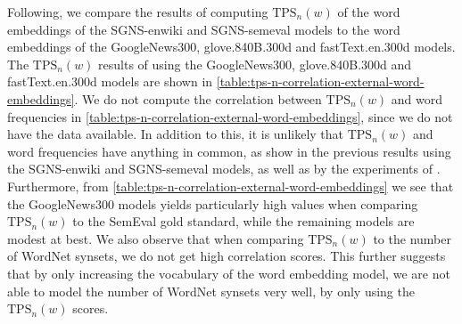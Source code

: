 
Following, we compare the results of computing $\text{TPS}_n(w)$ of the word embeddings of the SGNS-enwiki and SGNS-semeval models to the word embeddings of the GoogleNews300, glove.840B.300d and fastText.en.300d models. The $\text{TPS}_n(w)$ results of using the GoogleNews300, glove.840B.300d and fastText.en.300d models are shown in \cref{table:tps-n-correlation-external-word-embeddings}. We do not compute the correlation between $\text{TPS}_n(w)$ and word frequencies in \cref{table:tps-n-correlation-external-word-embeddings}, since we do not have the data available. In addition to this, it is unlikely that $\text{TPS}_n(w)$ and word frequencies have anything in common, as show in the previous results using the SGNS-enwiki and SGNS-semeval models, as well as by the experiments of \cite{jakubowski2020topology}. Furthermore, from \cref{table:tps-n-correlation-external-word-embeddings} we see that the GoogleNews300 models yields particularly high values when comparing $\text{TPS}_n(w)$ to the SemEval gold standard, while the remaining models are modest at best. We also observe that when comparing $\text{TPS}_n(w)$ to the number of WordNet synsets, we do not get high correlation scores. This further suggests that by only increasing the vocabulary of the word embedding model, we are not able to model the number of WordNet synsets very well, by only using the $\text{TPS}_n(w)$ scores.
